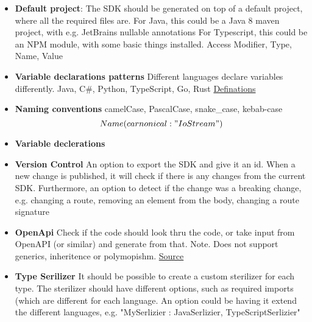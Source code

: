 \begin{itemize}
    \item \textbf{Default project}: The SDK should be generated on top of a default project, where all the required files are.
    For Java, this could be a Java 8 maven project, with e.g. JetBrains nullable annotations
    For Typescript, this could be an NPM module, with some basic things installed.
    Access Modifier, Type, Name, Value 

    \item \textbf{Variable declarations patterns} Different languages declare variables differently.
    Java, C\#, Python, TypeScript, Go, Rust
    \hyperlink{https://blogger.googleusercontent.com/img/b/R29vZ2xl/AVvXsEjuc3AMG0GuHzqNIR1eLR4h5hTY-DJBgT9LCXziFdJMHiQzRC8L5_5zBrTUuujObkfBtcfyA8XmqK7JbY-vGf-i2M4Fx2Nn8nT6I_9rw0Qg-hw3T40Ha40qjA82Aqs8TLLz1Z5XEJdXE6rpWLQnMc3agYGDKRKda4C5yQnVUQKTWIlyz76rizvgJXNH/s608/2022-12-04_110650.png}{Definations}
    
    \item \textbf{Naming conventions} camelCase, PascalCase, snake\_case, kebab-case \\

    \[Name(carnonical: "IoStream")\]

    \item \textbf{Variable declerations}
    
    \item \textbf{Version Control} An option to export the SDK and give it an id. When a new change is published, it will check if there is any changes from the current SDK.
    Furthermore, an option to detect if the change was a breaking change, e.g. changing a route, removing an element from the body, changing a route signature
    
    \item \textbf{OpenApi} Check if the code should look thru the code, or take input from OpenAPI (or similar) and generate from that.
    Note. Does not support generics, inheritence or polymopishm. \href{https://document360.com/blog/open-api/}{Source}
    
    \item \textbf{Type Serilizer} It should be possible to create a custom sterilizer for each type.
    The sterilizer should have different options, such as required imports (which are different for each language.
    An option could be having it extend the different languages, e.g. "MySerlizier : JavaSerlizier, TypeScriptSerlizier"


\end{itemize}
